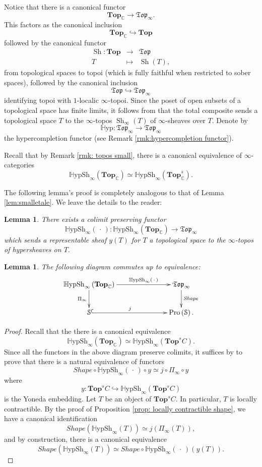 \documentclass[12pt]{amsart}
\newtheorem{lemma}[dummy]{Lemma}
\theoremstyle{definition}
\newcommand{\cS}{\mathcal{S}}
\newcommand{\TopC}{\Top_\mathbb{C}}
\newcommand{\TopCs}{\TopC^s}
\newcommand{\Sh}{\operatorname{Sh}}
\def\Top{\mathbf{Top}}
\renewcommand{\i}{\infty}
\def\Pro{\operatorname{Pro}}
\def\Shi{\Sh_\i}
\def\Hshi{\mathbb{H}\mathrm{ypSh}_\i}
\def\blank{\mspace{3mu}\cdot\mspace{3mu}}
\def\Shape{\mathit{Shape}}
\def\Top{\mathbf{Top}}
\begin{document}
Notice that there is a canonical functor $$\TopC \to \mathfrak{Top}_\i.$$ This factors as the canonical inclusion $$\TopC \hookrightarrow \Top$$ followed by the canonical functor
\begin{eqnarray*}
\Sh:\Top &\to& \mathfrak{Top}\\
T &\mapsto& \Sh\left(T\right),
\end{eqnarray*}
from topological spaces to topoi (which is fully faithful when restricted to sober spaces), followed by the canonical inclusion $$\mathfrak{Top} \hookrightarrow \mathfrak{Top}_\i$$ identifying topoi with $1$-localic $\i$-topoi. Since the poset of open subsets of a topological space has finite limits, it follows from \cite[Proposition 6.4.5.4]{htt} that the total composite sends a topological space $T$ to the $\i$-topos $\Shi\left(T\right)$ of $\i$-sheaves over $T.$ Denote by $$\mathbb{H}\mathrm{yp}:\mathfrak{Top}_\i \to \mathfrak{Top}_\i$$ the hypercompletion functor (see Remark \ref{rmk:hypercompletion functor}).

Recall that by Remark \ref{rmk: topos small}, there is a canonical equivalence of $\i$-categories $$\Hshi\left(\TopC\right) \simeq \Hshi\left(\TopCs\right).$$

The following lemma's proof is completely analogous to that of Lemma \ref{lem:smalletale}. We leave the details to the reader:

\begin{lemma}
There exists a colimit preserving functor
$$\Hshi\left(\blank\right):\Hshi\left(\TopC\right) \to \mathfrak{Top}_\i$$ which sends a representable sheaf $y\left(T\right)$ for $T$ a topological space to the $\i$-topos of hypersheaves on $T.$
\end{lemma}

\begin{lemma}\label{lem: hypershape homotopy}
The following diagram commutes up to equivalence:
$$\xymatrix@C=2.5cm{\Hshi\left(\TopC\right) \ar[r]^-{\Hshi\left(\blank\right)} \ar[d]_-{\Pi_\i} & \mathfrak{Top}_\i \ar[d]^-{\Shape}\\
\cS \ar@{^{(}->}[r]^-{j} & \Pro\left(\cS\right).}$$
\end{lemma}

\begin{proof}
Recall that the there is a canonical equivalence $$\Hshi\left(\TopC\right)\simeq \Hshi\left(\Top^sC\right).$$ Since all the functors in the above diagram preserve colimits, it suffices by \cite[Proposition 5.5.4.20, Theorem 5.1.5.6]{htt} to prove that there is a natural equivalence of functors
$$\Shape \circ \Hshi\left(\blank\right) \circ y \simeq j \circ \Pi_\i \circ y$$ where $$y:\Top^sC \hookrightarrow \Hshi\left(\Top^sC\right)$$ is the Yoneda embedding. Let $T$ be an object of $\Top^sC.$ In particular, $T$ is locally contractible. By the proof of Proposition \ref{prop: locally contractible shape}, we have a canonical identification $$\Shape\left(\Hshi\left(T\right)\right)\simeq j\left(\Pi_\i\left(T\right)\right),$$ and by construction, there is a canonical equivalence $$\Shape\left(\Hshi\left(T\right)\right) \simeq \Shape \circ \Hshi\left(\blank\right)\left(y\left(T\right)\right).$$
\end{proof}
\end{document}
